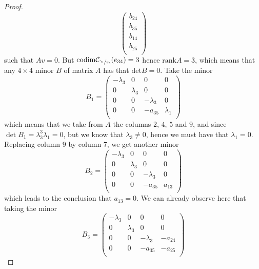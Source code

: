 \documentclass[12pt,fleqn]{article}
\begin{document}
\begin{proof}
\[\begin{pmatrix}
b_{24}\\
b_{35}\\
b_{14}\\
b_{25}\\
\end{pmatrix}
\]
such that $Av=0$. But $\mathrm{codim}\mathcal{C}_{\sfrac{\gamma_1}{\gamma_5}}(e_{34})=3$ hence $\mathrm{rank}A=3$, which means that any $4\times 4$ minor $B$ of matrix $A$ has that $\mathrm{det}B=0$. Take the minor \[
B_1=\begin{pmatrix}
-\lambda_3 & 0 & 0 & 0\\
0 & \lambda_3 & 0 & 0\\
0 & 0 & -\lambda_3 & 0\\
0 & 0 & -a_{35} & \lambda_1\\ 
\end{pmatrix}
\]
which means that we take from $A$ the columns $2$, $4$, $5$ and $9$, and since $\det B_1=\lambda_3^3\lambda_1=0$, but we know that $\lambda_3\neq 0$, hence we must have that $\lambda_1=0$. Replacing column $9$ by column $7$, we get another minor  \[
B_2=\begin{pmatrix}
-\lambda_3 & 0 & 0 & 0\\
0 & \lambda_3 & 0 & 0\\
0 & 0 & -\lambda_3 & 0\\
0 & 0 & -a_{35} & a_{13}\\ 
\end{pmatrix}
\]
which leads to the conclusion that $a_{13}=0$. We can already observe here that taking the minor \[
B_3=\begin{pmatrix}
-\lambda_3 & 0 & 0 & 0\\
0 & \lambda_3 & 0 & 0\\
0 & 0 & -\lambda_3 & -a_{24}\\
0 & 0 & -a_{35} & -a_{25}\\ 
\end{pmatrix}
\]

\end{proof}
\end{document}
